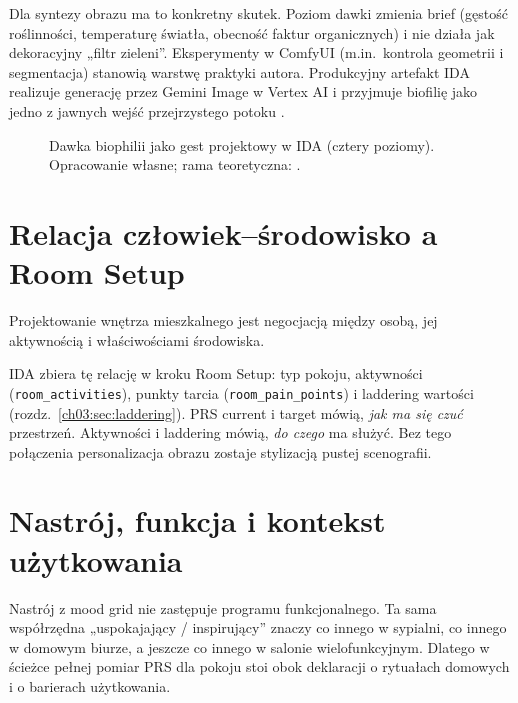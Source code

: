 Dla syntezy obrazu ma to konkretny skutek. Poziom dawki zmienia brief (gęstość roślinności, temperaturę światła, obecność faktur organicznych) i nie działa jak dekoracyjny „filtr zieleni”.
Eksperymenty w ComfyUI (m.in.\ kontrola geometrii i segmentacja) stanowią warstwę praktyki autora. Produkcyjny artefakt IDA realizuje generację przez Gemini Image w Vertex AI i przyjmuje biofilię jako jedno z jawnych wejść przejrzystego potoku \parencite{idaPlatform2026}.

\begin{figure}[htbp]
  \centering
  \caption{Dawka biophilii jako gest projektowy w IDA (cztery poziomy).
    Opracowanie własne; rama teoretyczna: \textcite{kellert2008biophilic}.}
  \label{fig:ch02:biophilia}
\end{figure}

\section{Relacja człowiek--środowisko a Room Setup}
\label{ch02:sec:peo}

Projektowanie wnętrza mieszkalnego jest negocjacją między osobą, jej aktywnością i właściwościami środowiska.

IDA zbiera tę relację w kroku Room Setup: typ pokoju, aktywności (\texttt{room\_activities}), punkty tarcia (\texttt{room\_pain\_points}) i laddering wartości (rozdz.~\ref{ch03:sec:laddering}).
PRS current i target mówią, \emph{jak ma się czuć} przestrzeń. Aktywności i laddering mówią, \emph{do czego} ma służyć.
Bez tego połączenia personalizacja obrazu zostaje stylizacją pustej scenografii.

\section{Nastrój, funkcja i kontekst użytkowania}
\label{ch02:sec:nastroj}

Nastrój z mood grid nie zastępuje programu funkcjonalnego.
Ta sama współrzędna „uspokajający / inspirujący” znaczy co innego w sypialni, co innego w domowym biurze, a jeszcze co innego w salonie wielofunkcyjnym.
Dlatego w ścieżce pełnej pomiar PRS dla pokoju stoi obok deklaracji o rytuałach domowych i o barierach użytkowania.

